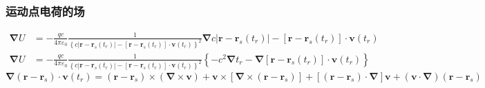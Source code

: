 \subsubsection{运动点电荷的场}
\begin{align*}
    \boldsymbol{\nabla}U&=-\frac{qc}{4\pi\varepsilon_0} \frac{1}{\left\{c|\boldsymbol{r} - \boldsymbol{r}_s(t_r)|-[\boldsymbol{r}-\boldsymbol{r}_s(t_r)]\cdot\boldsymbol{v}(t_r)\right\}^2}\boldsymbol{\nabla}c|\boldsymbol{r} - \boldsymbol{r}_s(t_r)|-[\boldsymbol{r}-\boldsymbol{r}_s(t_r)]\cdot\boldsymbol{v}(t_r)\\
    \boldsymbol{\nabla}U&=-\frac{qc}{4\pi\varepsilon_0} \frac{1}{\left\{c|\boldsymbol{r} - \boldsymbol{r}_s(t_r)|-[\boldsymbol{r}-\boldsymbol{r}_s(t_r)]\cdot\boldsymbol{v}(t_r)\right\}^2}\left\{-c^2\boldsymbol{\nabla}t_r-\boldsymbol{\nabla}[\boldsymbol{r}-\boldsymbol{r}_s(t_r)]\cdot\boldsymbol{v}(t_r)\right\}
\end{align*}
$$\boldsymbol{\nabla}(\boldsymbol{r}-\boldsymbol{r}_s)\cdot\boldsymbol{v}(t_r)
    =(\boldsymbol{r}-\boldsymbol{r}_s)\times(\boldsymbol{\nabla}\times\boldsymbol{v})+
    \boldsymbol{v}\times[\boldsymbol{\nabla}\times(\boldsymbol{r}-\boldsymbol{r}_s)]+
    [(\boldsymbol{r}-\boldsymbol{r}_s)\cdot\boldsymbol{\nabla}]\boldsymbol{v}+
    (\boldsymbol{v}\cdot\boldsymbol{\nabla})(\boldsymbol{r}-\boldsymbol{r}_s)$$
